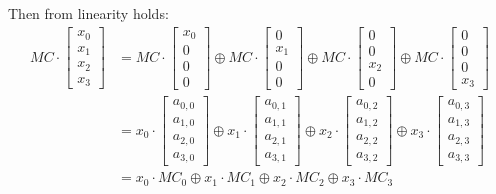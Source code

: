 \documentclass[11pt,oneside,final]{fithesis2}
\begin{document}
    Then from linearity holds:
    \begin{equation} \label{eq:mmul_linearity}
    \begin{aligned}
    MC \cdot \begin{bmatrix}
	x_0\\
	x_1\\
	x_2\\
	x_3
    \end{bmatrix} &= MC \cdot \begin{bmatrix} x_0 \\ 0   \\ 0    \\ 0   \end{bmatrix} \oplus 
		     MC \cdot \begin{bmatrix} 0   \\ x_1 \\ 0    \\ 0   \end{bmatrix} \oplus 
		     MC \cdot \begin{bmatrix} 0   \\ 0   \\ x_2  \\ 0   \end{bmatrix} \oplus
		     MC \cdot \begin{bmatrix} 0   \\ 0   \\ 0    \\ x_3 \end{bmatrix} \\ 
                 &= x_0 \cdot \begin{bmatrix} a_{0,0} \\ a_{1,0} \\ a_{2,0} \\ a_{3,0} \end{bmatrix} \oplus
		    x_1 \cdot \begin{bmatrix} a_{0,1} \\ a_{1,1} \\ a_{2,1} \\ a_{3,1} \end{bmatrix} \oplus
		    x_2 \cdot \begin{bmatrix} a_{0,2} \\ a_{1,2} \\ a_{2,2} \\ a_{3,2} \end{bmatrix} \oplus
		    x_3 \cdot \begin{bmatrix} a_{0,3} \\ a_{1,3} \\ a_{2,3} \\ a_{3,3} \end{bmatrix} \\
		 &= x_0 \cdot MC_0 \oplus x_1 \cdot MC_1 \oplus x_2 \cdot MC_2 \oplus x_3 \cdot MC_3
    \end{aligned}
    \end{equation}
    
\end{document}
